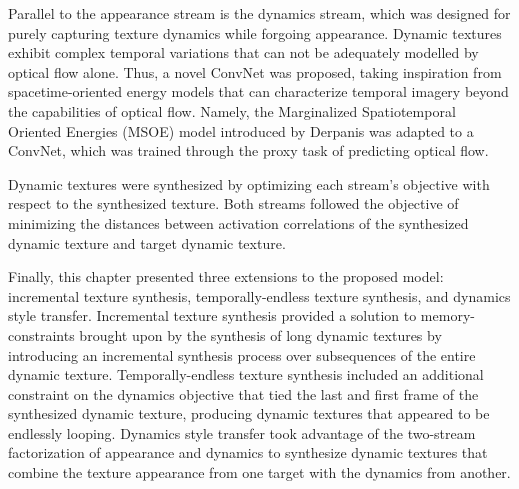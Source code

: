 Parallel to the appearance stream is the dynamics stream, which was designed for purely capturing texture dynamics while forgoing appearance. Dynamic textures exhibit complex temporal variations that can not be adequately modelled by optical flow alone. Thus, a novel ConvNet was proposed, taking inspiration from spacetime-oriented energy models \cite{derpanis2012spacetime,simoncelli1998} that can characterize temporal imagery beyond the capabilities of optical flow. Namely, the Marginalized Spatiotemporal Oriented Energies (MSOE) model introduced by Derpanis \etal \cite{derpanis2012spacetime} was adapted to a ConvNet, which was trained through the proxy task of predicting optical flow.

Dynamic textures were synthesized by optimizing each stream's objective with respect to the synthesized texture. Both streams followed the objective of minimizing the distances between activation correlations of the synthesized dynamic texture and target dynamic texture.

Finally, this chapter presented three extensions to the proposed model: incremental texture synthesis, temporally-endless texture synthesis, and dynamics style transfer. Incremental texture synthesis provided a solution to memory-constraints brought upon by the synthesis of long dynamic textures by introducing an incremental synthesis process over subsequences of the entire dynamic texture. Temporally-endless texture synthesis included an additional constraint on the dynamics objective that tied the last and first frame of the synthesized dynamic texture, producing dynamic textures that appeared to be endlessly looping. Dynamics style transfer took advantage of the two-stream factorization of appearance and dynamics to synthesize dynamic textures that combine the texture appearance from one target with the dynamics from another.